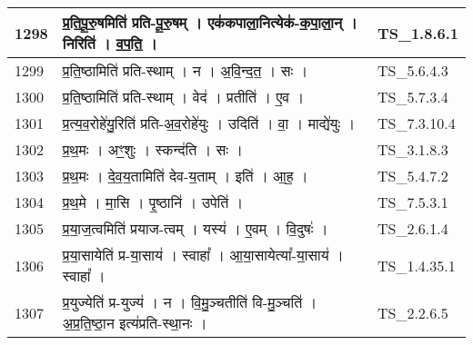 \documentclass[17pt]{extarticle}
\begin{document}
\begin{longtable}{||p{0.4in}||p{4.9in}||p{0.9in}||}
    \hline
        
    1298 & प्र॒ति॒पू॒रु॒षमिति॑ प्रति{-}पू॒रु॒षम्   ।   एक॑कपाला॒नित्येक॑{-}क॒पा॒ला॒न्   ।   निरिति॑   ।   व॒प॒ति॒   ।    & TS\_1.8.6.1       \\
    
    \hline
        
    1299 & प्र॒ति॒ष्ठामिति॑ प्रति{-}स्थाम्   ।   न   ।   अ॒वि॒न्द॒त॒   ।   सः   ।    & TS\_5.6.4.3       \\
    
    \hline
        
    1300 & प्र॒ति॒ष्ठामिति॑ प्रति{-}स्थाम्   ।   वेद॑   ।   प्रतीति॑   ।   ए॒व   ।    & TS\_5.7.3.4       \\
    
    \hline
        
    1301 & प्र॒त्य॒व॒रोहे॑यु॒रिति॑ प्रति{-}अ॒व॒रोहे॑युः   ।   उदिति॑   ।   वा॒   ।   माद्ये॑युः   ।    & TS\_7.3.10.4       \\
    
    \hline
        
    1302 & प्र॒थ॒मः   ।   अꣳ॒॒शुः   ।   स्कन्द॑ति   ।   सः   ।    & TS\_3.1.8.3       \\
    
    \hline
        
    1303 & प्र॒थ॒मः   ।   दे॒व॒य॒तामिति॑ देव{-}य॒ताम्   ।   इति॑   ।   आ॒ह॒   ।    & TS\_5.4.7.2       \\
    
    \hline
        
    1304 & प्र॒थ॒मे   ।   मा॒सि   ।   पृ॒ष्ठानि॑   ।   उपेति॑   ।    & TS\_7.5.3.1       \\
    
    \hline
        
    1305 & प्र॒या॒ज॒त्वमिति॑ प्रयाज{-}त्वम्   ।   यस्य॑   ।   ए॒वम्   ।   वि॒दुषः॑   ।    & TS\_2.6.1.4       \\
    
    \hline
        
    1306 & प्र॒या॒सायेति॑ प्र{-}या॒साय॑   ।   स्वाहा᳚   ।   आ॒या॒सायेत्या᳚{-}या॒साय॑   ।   स्वाहा᳚   ।    & TS\_1.4.35.1       \\
    
    \hline
        
    1307 & प्र॒युज्येति॑ प्र{-}युज्य॑   ।   न   ।   वि॒मु॒ञ्चतीति॑ वि{-}मु॒ञ्चति॑   ।   अ॒प्र॒ति॒ष्ठा॒न इत्य॑प्रति{-}स्था॒नः   ।    & TS\_2.2.6.5       \\
    

\end{longtable}
\end{document}
